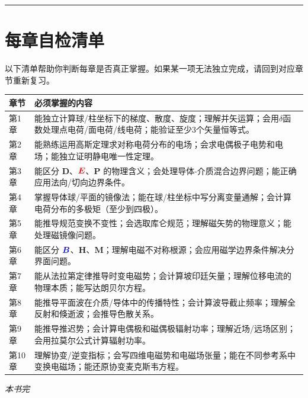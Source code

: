 \documentclass[11pt,a4paper,openany,oneside]{book}
\newcommand{\vecE}{\textcolor{red}{\vect{E}}}
\newcommand{\vecB}{\textcolor{blue}{\vect{B}}}
\newcommand{\vect}[1]{\bm{#1}}
\begin{document}
\vspace{2em}
\noindent\rule{\textwidth}{0.4pt}
\vspace{1em}



\section*{每章自检清单}

以下清单帮助你判断每章是否真正掌握。如果某一项无法独立完成，请回到对应章节重新复习。

\begin{center}
\begin{tabular}{@{}p{}p{}@{}}
\toprule
\textbf{章节} & \textbf{必须掌握的内容} \\
\midrule
第1章 & 能独立计算球/柱坐标下的梯度、散度、旋度；理解并矢运算；会用$\delta$函数处理点电荷/面电荷/线电荷；能验证至少3个矢量恒等式。 \\
第2章 & 能熟练运用高斯定理求对称电荷分布的电场；会求电偶极子电势和电场；能独立证明静电唯一性定理。 \\
第3章 & 能区分 $\vect{D}$、$\vecE$、$\vect{P}$ 的物理含义；会处理导体-介质混合边界问题；能正确应用法向/切向边界条件。 \\
第4章 & 掌握导体球/平面的镜像法；能在球/柱坐标中写分离变量通解；会计算电荷分布的多极矩（至少到四极）。 \\
第5章 & 能推导规范变换不变性；会选取库仑规范；理解磁矢势的物理意义；能处理磁镜像问题。 \\
第6章 & 能区分 $\vecB$、$\vect{H}$、$\vect{M}$；理解电磁不对称根源；会应用磁学边界条件解决分界面问题。 \\
第7章 & 能从法拉第定律推导时变电磁势；会计算坡印廷矢量；理解位移电流的物理本质；能写达朗贝尔方程。 \\
第8章 & 能推导平面波在介质/导体中的传播特性；会计算波导截止频率；理解全反射和倏逝波；会推导色散关系。 \\
第9章 & 能推导推迟势；会计算电偶极和磁偶极辐射功率；理解近场/远场区别；会用拉莫尔公式计算辐射功率。 \\
第10章 & 理解协变/逆变指标；会写四维电磁势和电磁场张量；能在不同参考系中变换电磁场；能还原协变麦克斯韦方程。 \\
\bottomrule
\end{tabular}
\end{center}

\begin{center}
\textit{本书完}
\end{center}
\end{document}
